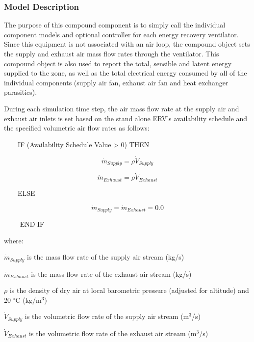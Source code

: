 \subsubsection{Model Description}\label{model-description-3-004}

The purpose of this compound component is to simply call the individual component models and optional controller for each energy recovery ventilator. Since this equipment is not associated with an air loop, the compound object sets the supply and exhaust air mass flow rates through the ventilator. This compound object is also used to report the total, sensible and latent energy supplied to the zone, as well as the total electrical energy consumed by all of the individual components (supply air fan, exhaust air fan and heat exchanger parasitics).

During each simulation time step, the air mass flow rate at the supply air and exhaust air inlets is set based on the stand alone ERV's availability schedule and the specified volumetric air flow rates as follows:

~~~~IF (Availability Schedule Value \textgreater{} 0) THEN

\begin{equation}
\dot{m}_{Supply} = \rho \dot{V}_{Supply}
\end{equation}

\begin{equation}
\dot{m}_{Exhaust} = \rho \dot{V}_{Exhaust}
\end{equation}

~~~~ELSE

\begin{equation}
\dot{m}_{Supply} = \dot{m}_{Exhaust} = 0.0
\end{equation}

~~~~ END IF

where:

\(\dot{m}_{Supply}\) is the mass flow rate of the supply air stream (kg/s)

\(\dot{m}_{Exhaust}\) is the mass flow rate of the exhaust air stream (kg/s)

\(\rho\) is the density of dry air at local barometric pressure (adjusted for altitude) and 20 \(^{\circ}\)C (kg/m\(^{3}\))

\(\dot{V}_{Supply}\) is the volumetric flow rate of the supply air stream (m\(^{3}\)/s)

\({\dot{V}_{Exhaust}}\) is the volumetric flow rate of the exhaust air stream (m\(^{3}\)/s)

